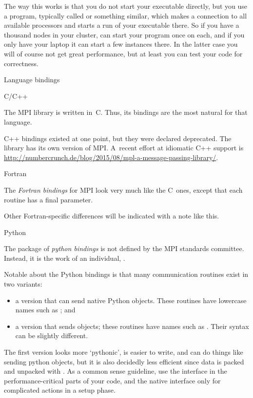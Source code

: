 The way this works is that you do not start your executable directly,
but you use a program, typically called  or
something similar, which makes a connection to all available
processors and starts a run of your executable there. So if you have a
thousand nodes in your cluster,  can start your program once
on each, and if you only have your laptop it can start a few instances
there. In the latter case you will of course not get great
performance, but at least you can test your code for correctness.

 {Language bindings}

 {C/C++}

The MPI library is written in~C. Thus, its bindings are the most natural
for that language.

C++ bindings existed at one point, but they were declared deprecated.
The  library has its own version of MPI.  A~recent
effort at idiomatic C++ support is 
\url{http://numbercrunch.de/blog/2015/08/mpl-a-message-passing-library/}.


 {Fortran}


The \emph{Fortran bindings} for MPI look very much like the C~ones, except that
each routine has a final  parameter.

\begin{fortrannote}
  Other Fortran-specific differences will be indicated with a note
  like this.
\end{fortrannote}


 {Python}
\label{sec:python-bind}

The  package of \emph{python bindings}
is not defined by the MPI
standards committee. Instead, it is the work of an individual,
.

Notable about the Python bindings is that many communication routines
exist in two variants:
\begin{itemize}
\item a version that can send native Python objects. These routines
  have lowercase names such as ; and
\item a version that sends  objects; these routines
  have names such as . Their syntax can be slightly different.
\end{itemize}
The first version looks more `pythonic', is easier to write,
and can do things like sending python objects,
but it is also decidedly less efficient since data is packed
and unpacked with . As a common sense guideline,
use the  interface in the performance-critical parts
of your code, and the native interface only for complicated
actions in a setup phase.

